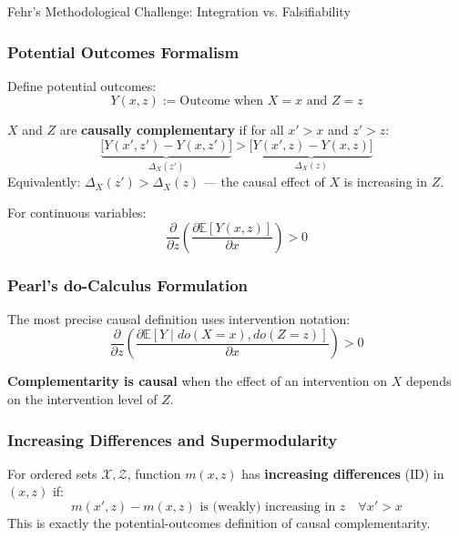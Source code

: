 \begin{chapter}{Fehr's Methodological Challenge: Integration vs. Falsifiability}
\subsubsection{Potential Outcomes Formalism}

Define potential outcomes:
\begin{equation}
Y(x,z) := \text{Outcome when } X=x \text{ and } Z=z
\end{equation}

\begin{definition}
\label{def:causal-complementarity}
$X$ and $Z$ are \textbf{causally complementary} if for all $x' > x$ and $z' > z$:
\begin{equation}
\underbrace{\big[ Y(x', z') - Y(x, z') \big]}_{\Delta_X(z')} > \underbrace{\big[ Y(x', z) - Y(x, z) \big]}_{\Delta_X(z)}
\end{equation}
Equivalently: $\Delta_X(z') > \Delta_X(z)$ --- the causal effect of $X$ is increasing in $Z$.
\end{definition}

For continuous variables:
\begin{equation}
\frac{\partial}{\partial z}\left(\frac{\partial \mathbb{E}[Y(x,z)]}{\partial x}\right) > 0
\end{equation}

\subsubsection{Pearl's do-Calculus Formulation}

The most precise causal definition uses intervention notation:
\begin{equation}
\boxed{\frac{\partial}{\partial z}\left(\frac{\partial \mathbb{E}[Y \mid do(X=x), do(Z=z)]}{\partial x}\right) > 0}
\end{equation}

\begin{tcolorbox}[colback=blue!5!white,colframe=blue!75!black,title=Causal Complementarity Definition]
\textbf{Complementarity is causal} when the effect of an intervention on $X$ depends on the intervention level of $Z$.
\end{tcolorbox}

\subsubsection{Increasing Differences and Supermodularity}

\begin{definition}
\label{def:increasing-differences}
For ordered sets $\mathcal{X}, \mathcal{Z}$, function $m(x,z)$ has \textbf{increasing differences} (ID) in $(x,z)$ if:
\begin{equation}
m(x',z) - m(x,z) \text{ is (weakly) increasing in } z \quad \forall x' > x
\tag{ID}
\end{equation}
This is exactly the potential-outcomes definition of causal complementarity.
\end{definition}


\end{chapter}
